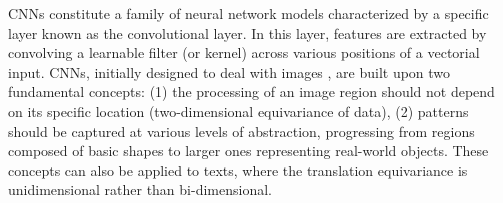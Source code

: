 \acp{CNN} constitute a family of neural network models characterized by a specific layer known as the convolutional layer. In this layer, features are extracted by convolving a learnable filter (or kernel) across various positions of a vectorial input.
\acp{CNN}, initially designed to deal with images \citep{lecun1989backpropagation}, are built upon two fundamental concepts: (1) the processing of an image region should not depend on its specific location (two-dimensional equivariance of data), (2) patterns should be captured at various levels of abstraction, progressing from regions composed of basic shapes to larger ones representing real-world objects. These concepts can also be applied to texts, where the translation equivariance is unidimensional rather than bi-dimensional. 






